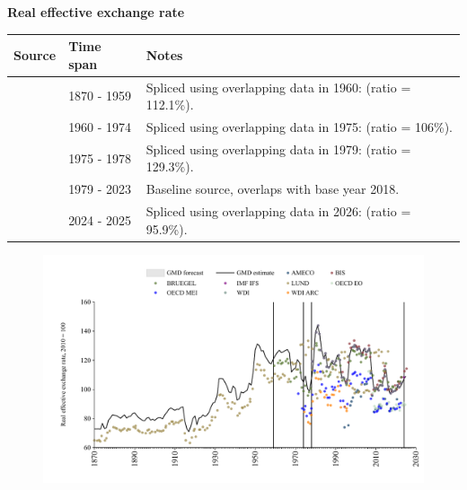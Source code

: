 \documentclass[12pt,a4paper,landscape]{article}
\begin{document}
\begin{adjustbox}{max totalsize={\paperwidth}{\paperheight},center}
\begin{minipage}[t][\textheight][t]{\textwidth}
\vspace*{0.5cm}
{}
\begin{center}
{\Large\bfseries Real effective exchange rate}
\end{center}
\vspace{0.5cm}
\begin{table}[H]
\centering
\small
\begin{tabular}{|l|l|l|}
\hline
\textbf{Source} & \textbf{Time span} & \textbf{Notes} \\
\hline
\rowcolor{white}\cite{LUND}& 1870 - 1959 &Spliced using overlapping data in 1960: (ratio = 112.1\%). \\
\rowcolor{lightgray}\cite{BRUEGEL}& 1960 - 1974 &Spliced using overlapping data in 1975: (ratio = 106\%). \\
\rowcolor{white}\cite{WDI_ARC}& 1975 - 1978 &Spliced using overlapping data in 1979: (ratio = 129.3\%). \\
\rowcolor{lightgray}\cite{WDI}& 1979 - 2023 &Baseline source, overlaps with base year 2018. \\
\rowcolor{white}\cite{BIS}& 2024 - 2025 &Spliced using overlapping data in 2026: (ratio = 95.9\%). \\
\hline
\end{tabular}
\end{table}
\begin{figure}[H]
\centering
\includegraphics[width=\textwidth,height=0.6\textheight,keepaspectratio]{graphs/GBR_REER.pdf}
\end{figure}
\end{minipage}
\end{adjustbox}
\end{document}
